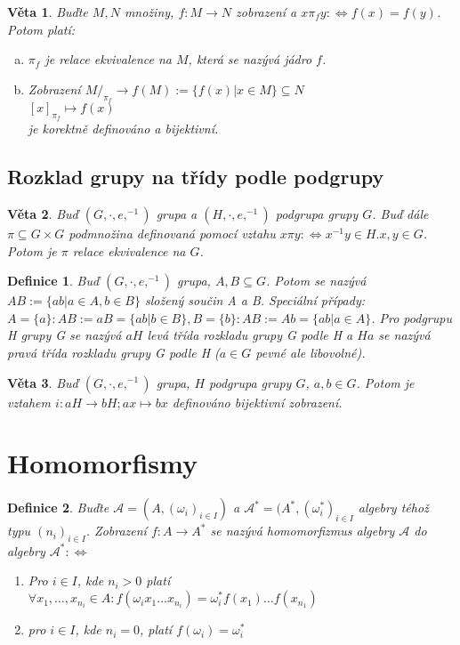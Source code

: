 \documentclass[a4paper, 11pt]{report}
\newtheorem{mydef}{Definice}[chapter]
\newtheorem{veta}{Věta}
\begin{document}
\begin{veta}
Buďte $M, N$ množiny, $f: M \to N$ zobrazení a $x \pi_f y: \Leftrightarrow f(x) = f(y)$. Potom platí:
\begin{enumerate}[a)]
	\item $\pi_f$ je relace ekvivalence na $M$, která se nazývá jádro $f$.
	\item Zobrazení
	$M/_{\pi_f} \to f(M) := \{f(x) | x \in M\} \subseteq N$\\
	$[x]_{\pi_f} \mapsto f(x)$\\
	je korektně definováno a bijektivní.
\end{enumerate}
\end{veta}

\subsection{Rozklad grupy na třídy podle podgrupy}

\begin{veta}
Buď $(G, \cdot, e, ^{-1})$ grupa a $(H, \cdot, e, ^{-1})$ podgrupa grupy $G$. Buď dále $\pi \subseteq G \times G$ podmnožina definovaná pomocí vztahu $x \pi y: \Leftrightarrow x^{-1}y \in H. x, y \in G$. Potom je $\pi$ relace ekvivalence na $G$.
\end{veta}

\begin{mydef}
Buď $(G, \cdot, e, ^{-1})$ grupa, $A, B \subseteq G$. Potom se nazývá $AB := \{ab | a \in A, b \in B\}$ složený součin A a B. Speciální případy: $A = \{a\}: AB := aB = \{ab | b \in B\}, B = \{b\}: AB := Ab = \{ab | a \in A\}$. Pro podgrupu H grupy G se nazývá $aH$ levá třída rozkladu grupy G podle H a $Ha$ se nazývá pravá třída rozkladu grupy G podle H ($a \in G$ pevné ale libovolné).
\end{mydef}

\begin{veta}
Buď $(G, \cdot, e, ^{-1})$ grupa, $H$ podgrupa grupy $G$, $a, b \in G$. Potom je vztahem $i: aH \to bH; ax \mapsto bx$ definováno bijektivní zobrazení.
\end{veta}


\section{Homomorfismy}

\begin{mydef}
Buďte $\mathcal{A} = (A, (\omega_i)_{i \in I})$ a $\mathcal{A}^* = (A^*, (\omega^*_i)_{i \in I}$ algebry téhož typu $(n_i)_{i \in I}$. Zobrazení $f: A \to A^*$ se nazývá homomorfizmus algebry $\mathcal{A}$ do algebry $\mathcal{A}^*: \Leftrightarrow$
\begin{enumerate}
	\item Pro $i \in I$, kde $n_i > 0$ platí $\forall x_1, \dots, x_{n_i} \in A: f(\omega_ix_1 \dots x_{n_i}) = \omega_i^*f(x_1)\dots f(x_{n_1})$
	\item pro $i \in I$, kde $n_i = 0$, platí $f(\omega_i) = \omega_i^*$
\end{enumerate}
\end{mydef}
\end{document}
